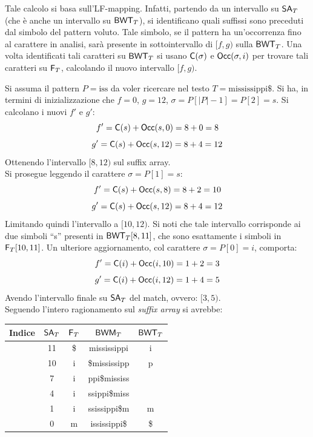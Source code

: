 Tale calcolo si basa sull'LF-mapping. Infatti, partendo da un
intervallo su $\mbox{\rm {\sf SA}}_T$ (che è anche un intervallo su $\mbox{\rm {\sf BWT}}_T$), si identificano
quali suffissi sono preceduti dal simbolo del pattern voluto. Tale simbolo, se
il 
pattern ha un'occorrenza fino al carattere in analisi, sarà presente in
sottointervallo di $[f,g)$ sulla $\mbox{\rm {\sf BWT}}_T$. Una volta identificati tali caratteri
su $\mbox{\rm {\sf BWT}}_T$ si usano $\mbox{\rm {\sf C}}(\sigma)$ e $\mbox{\rm {\sf Occ}}(\sigma, i)$ per trovare tali
caratteri su $\mbox{\rm {\sf F}}_T$, calcolando il nuovo intervallo $[f,g)$.
\begin{esempio}
  Si assuma il pattern $P=\mbox{iss}$ da voler ricercare nel testo
  $T=\mbox{mississippi\$}$. 
  Si ha, in termini di inizializzazione che $f=0$, $g=12$,
  $\sigma=P[|P|-1]=P[2]=s$. Si calcolano i nuovi $f'$ e $g'$:
  \[f'=\mbox{\rm {\sf C}}(s)+\mbox{\rm {\sf Occ}}(s, 0)=8+0=8\]
  \[g'=\mbox{\rm {\sf C}}(s)+\mbox{\rm {\sf Occ}}(s, 12)=8+4=12\]
  Ottenendo l'intervallo $[8,12)$ sul suffix array.\\
  Si prosegue leggendo il carattere $\sigma=P[1]=s$:
  \[f'=\mbox{\rm {\sf C}}(s)+\mbox{\rm {\sf Occ}}(s, 8)=8+2=10\]
  \[g'=\mbox{\rm {\sf C}}(s)+\mbox{\rm {\sf Occ}}(s, 12)=8+4=12\]
  Limitando quindi l'intervallo a $[10,12)$. Si noti che tale intervallo
  corrisponde ai due simboli ``s'' presenti in $\mbox{\rm {\sf BWT}}_T[8,11]$, che sono
  esattamente i simboli in $\mbox{\rm {\sf F}}_T[10,11]$.
  Un ulteriore aggiornamento, col carattere $\sigma=P[0]=i$, comporta:
  \[f'=\mbox{\rm {\sf C}}(i)+\mbox{\rm {\sf Occ}}(i, 10)=1+2=3\]
  \[g'=\mbox{\rm {\sf C}}(i)+\mbox{\rm {\sf Occ}}(i, 12)=1+4=5\]
  Avendo l'intervallo finale su $\mbox{\rm {\sf SA}}_T$ del match, ovvero: $[3,5)$.\\
  Seguendo l'intero ragionamento sul \textit{suffix array} si avrebbe:
  \begin{table}[H]
    \centering
    \scriptsize
    \begin{tabular}{c|c|c|c|c} 
      \textbf{Indice} & $\mbox{\rm {\sf SA}}_T$ & $\mbox{\rm {\sf F}}_T$ & $\mbox{\rm {\sf BWM}}_T$
      & $\mbox{\rm {\sf BWT}}_T$\\ 
      \hline
      {\color{nordred}{0}} & 11 & \$ & {\color{nordred}{\$}}mississippi & i\\
      {\color{nordred}{1}} & 10 & i & {\color{nordred}{i}}\$mississipp & p\\
      {\color{nordred}{2}} & 7 & i & {\color{nordred}{i}}ppi\$mississ
      & {\color{nordgreen}{s}}\\
      {\color{nordred}{3}} & 4 & i & {\color{nordred}{i}}ssippi\$miss
      & {\color{nordgreen}{s}}\\
      {\color{nordred}{4}} & 1 & i & {\color{nordred}{i}}ssissippi\$m & m\\
      {\color{nordred}{5}} & 0 & m & {\color{nordred}{m}}ississippi\$ & \$\\

\end{tabular}
\end{table}
\end{esempio}
